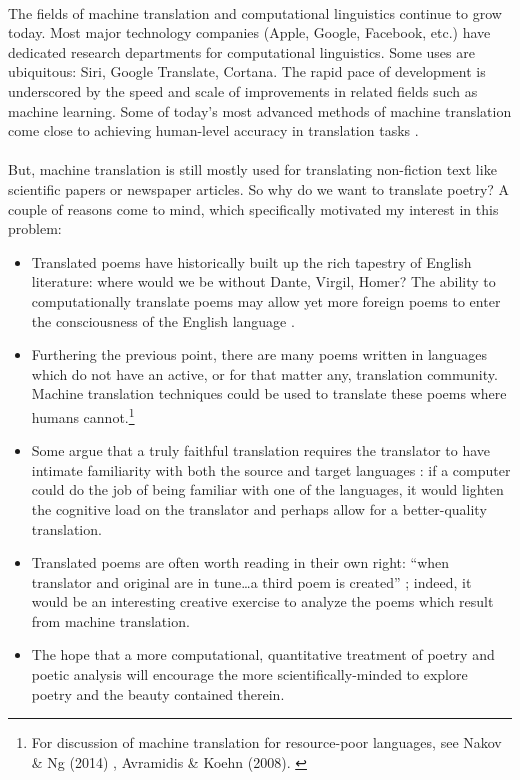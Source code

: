 \paragraph{}{The fields of machine translation and computational
  linguistics continue to grow today. Most major technology companies
  (Apple, Google, Facebook, etc.) have dedicated research departments
  for computational linguistics. Some uses are ubiquitous: Siri,
  Google Translate, Cortana. The rapid pace of development is
  underscored by the speed and scale of improvements in related fields
  such as machine learning. Some of today's most advanced methods of
  machine translation come close to achieving human-level accuracy in
  translation tasks \cite{gnmt}.}

\paragraph{}{But, machine translation is still mostly used for
  translating non-fiction text like scientific papers or newspaper
  articles. So why do we want to translate poetry? A couple of reasons
  come to mind, which specifically motivated my interest in this
  problem:}
\begin{itemize}
\item Translated poems have historically built up the rich tapestry of
  English literature: where would we be without Dante, Virgil, Homer?
  The ability to computationally translate poems may allow yet more
  foreign poems to enter the consciousness of the English language
  \cite{hist}.
\item Furthering the previous point, there are many poems written in
  languages which do not have an active, or for that matter any,
  translation community. Machine translation techniques could be used
  to translate these poems where humans cannot.\footnote{For
    discussion of machine translation for resource-poor languages, see
    Nakov \& Ng (2014) \cite{ng}, Avramidis \& Koehn (2008).
    \cite{avr}}
\item Some argue that a truly faithful translation requires the
  translator to have intimate familiarity with both the source and
  target languages \cite{fam}: if a computer could do the job of being
  familiar with one of the languages, it would lighten the cognitive
  load on the translator and perhaps allow for a better-quality
  translation.
\item Translated poems are often worth reading in their own right:
  ``when translator and original are in tune\ldots a third poem is
  created'' \cite{hist}; indeed, it would be an interesting creative
  exercise to analyze the poems which result from machine translation.
\item The hope that a more computational, quantitative treatment of
  poetry and poetic analysis will encourage the more
  scientifically-minded to explore poetry and the beauty contained
  therein.
\end{itemize}

